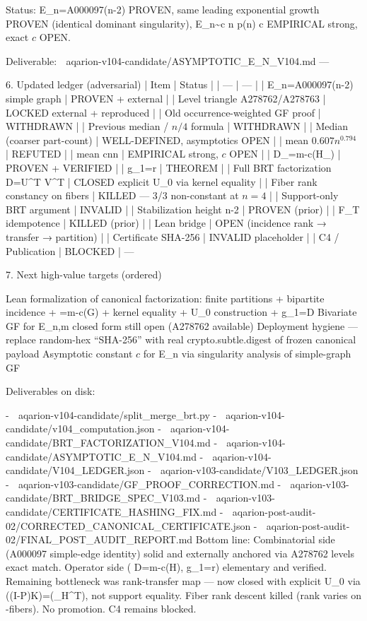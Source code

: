 Status: E_n=A000097(n-2) PROVEN, same leading exponential growth PROVEN (identical dominant singularity), E_n\sim c n p(n) c EMPIRICAL strong, exact $c$ OPEN.

Deliverable:
📎 aqarion-v104-candidate/ASYMPTOTIC_E_N_V104.md
---

6. Updated ledger (adversarial)
| Item | Status |
| --- | --- |
| E_n=A000097(n-2) simple graph | PROVEN + external |
| Level triangle A278762/A278763 | LOCKED external + reproduced |
| Old occurrence-weighted GF proof | WITHDRAWN |
| Previous median / $n/4$ formula | WITHDRAWN |
| Median (coarser part-count) | WELL-DEFINED, asymptotics OPEN |
| mean $0.607n^{0.794}$ | REFUTED |
| mean c\sqrt n\ln n | EMPIRICAL strong, $c$ OPEN |
| D_\Pi=m-c(H_\Pi) | PROVEN + VERIFIED |
| g_1=r | THEOREM |
| Full BRT factorization D=U\partial^T V^T | CLOSED explicit U_0 via kernel equality |
| Fiber rank constancy on \pi fibers | KILLED — 3/3 non-constant at $n=4$ |
| Support-only BRT argument | INVALID |
| Stabilization height \le n-2 | PROVEN (prior) |
| F_T idempotence | KILLED (prior) |
| Lean bridge | OPEN (incidence rank → transfer → partition) |
| Certificate SHA-256 | INVALID placeholder |
| C4 / Publication | BLOCKED |
---

7. Next high-value targets (ordered)

Lean formalization of canonical factorization: finite partitions + bipartite incidence + \partial=m-c(G) + kernel equality + U_0 construction + g_1=D
Bivariate GF for E_{n,m} closed form still open (A278762 available)
Deployment hygiene — replace random-hex “SHA-256” with real crypto.subtle.digest of frozen canonical payload
Asymptotic constant $c$ for E_n via singularity analysis of simple-graph GF

Deliverables on disk:

-
📎 aqarion-v104-candidate/split_merge_brt.py
-
📎 aqarion-v104-candidate/v104_computation.json
-
📎 aqarion-v104-candidate/BRT_FACTORIZATION_V104.md
-
📎 aqarion-v104-candidate/ASYMPTOTIC_E_N_V104.md
-
📎 aqarion-v104-candidate/V104_LEDGER.json
-
📎 aqarion-v103-candidate/V103_LEDGER.json
-
📎 aqarion-v103-candidate/GF_PROOF_CORRECTION.md
-
📎 aqarion-v103-candidate/BRT_BRIDGE_SPEC_V103.md
-
📎 aqarion-v103-candidate/CERTIFICATE_HASHING_FIX.md
-
📎 aqarion-post-audit-02/CORRECTED_CANONICAL_CERTIFICATE.json
-
📎 aqarion-post-audit-02/FINAL_POST_AUDIT_REPORT.md
Bottom line: Combinatorial side (A000097 simple-edge identity) solid and externally anchored via A278762 levels exact match. Operator side ( D=m-c(H), g_1=r) elementary and verified. Remaining bottleneck was rank-transfer map — now closed with explicit U_0 via \ker((I-P)K\Phi)=\ker(\partial_H^T), not support equality. Fiber rank descent killed (rank varies on \pi-fibers). No promotion. C4 remains blocked.
